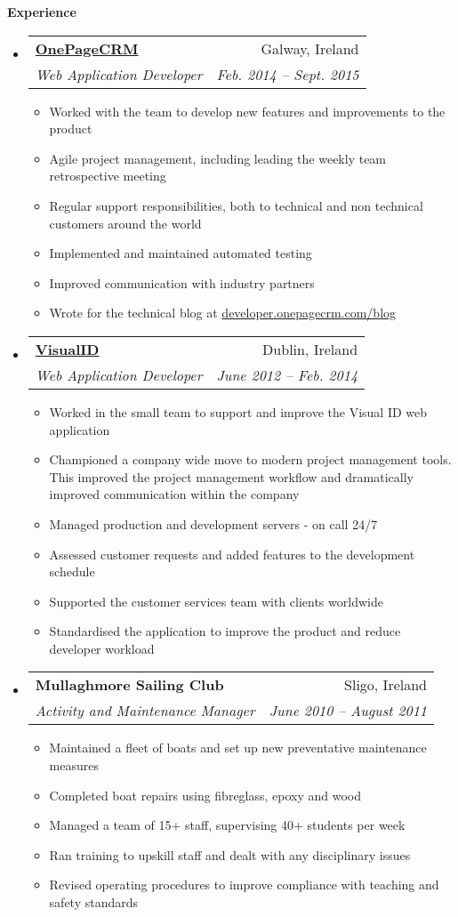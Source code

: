 \documentclass[letterpaper,11pt]{article}
\makeatletter
\newcommand{\resitem}[1]{\item #1 \vspace{-2pt}}
\newcommand{\resheading}[1]{{\large \colorbox{mygrey}{\begin{minipage}{\textwidth}{\textbf{#1 \vphantom{p\^{E}}}}\end{minipage}}}}
\newcommand{\ressubheading}[4]{
\begin{tabular*}{6.5in}{l@{\extracolsep{\fill}}r}
		\textbf{#1} & #2 \\
		\textit{#3} & \textit{#4} \\
\end{tabular*}\vspace{-6pt}}
\makeatother
\begin{document}
\resheading{Experience}
	\begin{itemize}
		\item 
			\ressubheading{\href{http://www.onepagecrm.com}{OnePageCRM}}{Galway, Ireland}
				{Web Application Developer}{Feb. 2014 -- Sept. 2015}
				{ 
				\begin{itemize}
					\resitem{Worked with the team to develop new features and improvements to the product}
					\resitem{Agile project management, including leading the weekly team retrospective meeting}
					\resitem{Regular support responsibilities, both to technical and non technical customers around the world}
					\resitem{Implemented and maintained automated testing}
					\resitem{Improved communication with industry partners}
					\resitem{Wrote for the technical blog at \href{http://developer.onepagecrm.com/blog}{developer.onepagecrm.com/blog}}
				\end{itemize}
				}

		  \item 
      \ressubheading{\href{http://visualid.com}{VisualID}}{Dublin, Ireland}{Web Application Developer}{June 2012 -- Feb. 2014}
        { 
        \begin{itemize}
      		\resitem{Worked in the small team to support and improve the Visual ID web application}
      		\resitem{Championed a company wide move to modern project management tools. This improved the project management workflow and dramatically improved communication within the company}
	        \resitem{Managed production and development servers - on call 24/7}
	        \resitem{Assessed customer requests and added features to the development schedule}
	        \resitem{Supported the customer services team with clients worldwide}
	        \resitem{Standardised the application to improve the product and reduce developer workload}
        \end{itemize}
        }
        
        \item
        \ressubheading{Mullaghmore Sailing Club}{Sligo, Ireland}{Activity and Maintenance Manager}{June 2010 -- August 2011}
        {
        \begin{itemize}
        \resitem{Maintained a fleet of boats and set up new preventative maintenance measures}
        \resitem{Completed boat repairs using fibreglass, epoxy and wood}
        \resitem{Managed a team of 15+ staff, supervising 40+ students per week}
        \resitem{Ran training to upskill staff and dealt with any disciplinary issues}
        \resitem{Revised operating procedures to improve compliance with teaching and safety standards}
        \end{itemize}
        }
        

\end{itemize}
\end{document}
